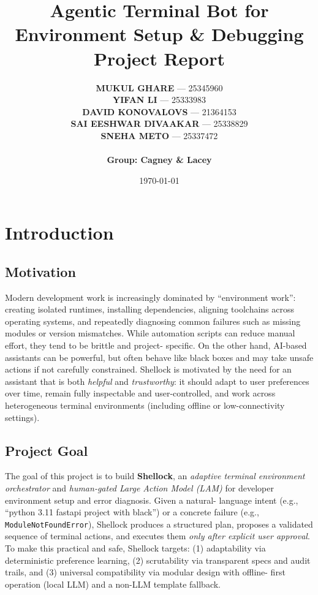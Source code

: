 \documentclass[12pt,a4paper]{article}
\title{\textbf{Agentic Terminal Bot for Environment Setup \& Debugging} \\ \large Project Report}
\author{
  \textbf{MUKUL GHARE} --- 25345960 \\
  \textbf{YIFAN LI} --- 25333983 \\
  \textbf{DAVID KONOVALOVS} --- 21364153 \\
  \textbf{SAI EESHWAR DIVAAKAR} --- 25338829 \\
  \textbf{SNEHA METO} --- 25337472 \\
  \\
  \textbf{Group: Cagney \& Lacey}
}
\date{\today}
\begin{document}
\justifying 

\maketitle


\tableofcontents

\section{Introduction}

\subsection{Motivation}
Modern development work is increasingly dominated by ``environment work'': creating isolated runtimes, installing
dependencies, aligning toolchains across operating systems, and repeatedly diagnosing common failures such as missing
modules or version mismatches. While automation scripts can reduce manual effort, they tend to be brittle and project-
specific. On the other hand, AI-based assistants can be powerful, but often behave like black boxes and may take
unsafe actions if not carefully constrained.\cite{amershi2019,shneiderman2020}
Shellock is motivated by the need for an assistant that is both \emph{helpful} and \emph{trustworthy}: it should adapt
to user preferences over time, remain fully inspectable and user-controlled, and work across heterogeneous terminal
environments (including offline or low-connectivity settings).\cite{amershi2019,shneiderman2020}

\subsection{Project Goal}
The goal of this project is to build \textbf{Shellock}, an \emph{adaptive terminal environment orchestrator} and
\emph{human-gated Large Action Model (LAM)} for developer environment setup and error diagnosis. Given a natural-
language intent (e.g., ``python 3.11 fastapi project with black'') or a concrete failure (e.g.,
\texttt{ModuleNotFoundError}), Shellock produces a structured plan, proposes a validated sequence of terminal actions,
and executes them \emph{only after explicit user approval}.\cite{amershi2019,shneiderman2020}
To make this practical and safe, Shellock targets: (1) adaptability via deterministic preference learning, (2)
scrutability via transparent specs and audit trails, and (3) universal compatibility via modular design with offline-
first operation (local LLM) and a non-LLM template fallback.
\end{document}
